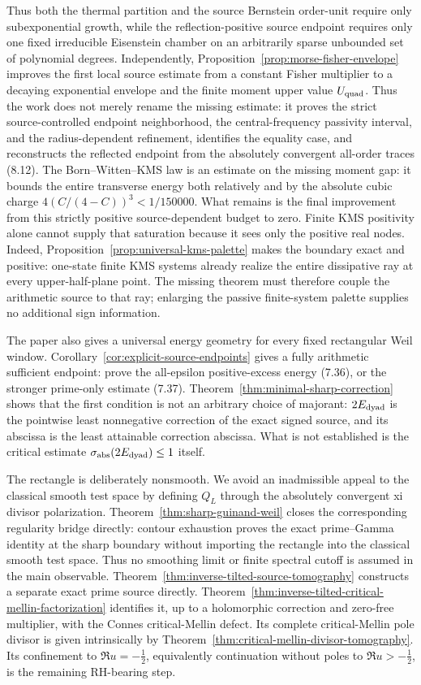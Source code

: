 \documentclass[11pt]{article}
\begin{document}
Thus both the thermal partition and the source Bernstein order-unit require only subexponential
growth, while the reflection-positive source endpoint requires only one fixed irreducible
Eisenstein chamber on an arbitrarily sparse unbounded set of polynomial degrees.
Independently, Proposition~\ref{prop:morse-fisher-envelope}
improves the first local source estimate from a constant Fisher multiplier to a decaying
exponential envelope and the finite moment upper value $U_{\rm quad}$.
Thus the work does not merely rename the missing estimate: it proves the strict source-controlled
endpoint neighborhood, the central-frequency passivity interval, and the radius-dependent
refinement, identifies the equality case, and
reconstructs the reflected endpoint from the absolutely convergent all-order traces
\textup{(8.12)}.  The Born--Witten--KMS law is an estimate on the missing moment gap: it bounds
the entire transverse energy both relatively and by the absolute cubic charge
$4(C/(4-C))^3<1/150000$.  What remains is the final improvement from this strictly positive
source-dependent budget to zero.  Finite KMS
positivity alone cannot supply that saturation because it sees only the positive real nodes.
Indeed, Proposition~\ref{prop:universal-kms-palette} makes the boundary exact and positive:
one-state finite KMS systems already realize the entire dissipative ray at every upper-half-plane
point.  The missing theorem must therefore couple the arithmetic source to that ray; enlarging
the passive finite-system palette supplies no additional sign information.

The paper also gives a universal energy geometry for every fixed rectangular Weil window.
Corollary~\ref{cor:explicit-source-endpoints} gives a
fully arithmetic sufficient endpoint: prove the all-epsilon positive-excess energy (7.36), or the
stronger prime-only estimate (7.37).  Theorem~\ref{thm:minimal-sharp-correction} shows that the
first condition is not an arbitrary choice of majorant: $2E_{\rm dyad}$ is the pointwise least nonnegative
correction of the exact signed source, and its abscissa is the least attainable correction
abscissa.  What is not established is the critical estimate
$\sigma_{\rm abs}(2E_{\rm dyad})\le1$ itself.

The rectangle is deliberately nonsmooth.  We avoid an inadmissible appeal to the classical smooth
test space by defining $Q_L$ through the absolutely convergent xi divisor polarization.
Theorem~\ref{thm:sharp-guinand-weil} closes the corresponding regularity bridge directly: contour
exhaustion proves the exact prime--Gamma identity at the sharp boundary without importing the
rectangle into the classical smooth test space.  Thus no smoothing limit or finite spectral
cutoff is assumed in the main observable.
Theorem~\ref{thm:inverse-tilted-source-tomography} constructs a separate exact prime source
directly.  Theorem~\ref{thm:inverse-tilted-critical-mellin-factorization} identifies it, up to a
holomorphic correction and zero-free multiplier, with the Connes critical-Mellin defect.  Its
complete critical-Mellin pole divisor is given intrinsically by
Theorem~\ref{thm:critical-mellin-divisor-tomography}.  Its confinement to
$\Re u=-\frac12$, equivalently continuation without poles to $\Re u>-\frac12$, is the remaining
RH-bearing step.
\end{document}

